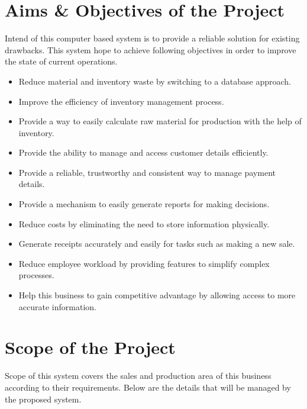 \documentclass[12pt]{report}
\begin{document}
\section{Aims \& Objectives of the Project}

Intend of this computer based system is to provide a reliable solution for existing drawbacks.  This system hope to achieve following objectives in order to improve the state of current operations.

\begin{itemize}
	\item Reduce material and inventory waste by switching to a database approach.

	\item Improve the efficiency of inventory management process.

	\item Provide a way to easily calculate raw material for production with the help of inventory.

	\item Provide the ability to manage and access customer details efficiently.

	\item Provide a reliable,  trustworthy and consistent way to manage payment details.

	\item Provide a mechanism to easily generate reports for making decisions.

	\item Reduce costs by eliminating the need to store information physically.

	\item Generate receipts accurately and easily for tasks such as making a new sale.

	\item Reduce employee workload by providing features to simplify complex processes.

	\item Help this business to gain competitive advantage by allowing access to more accurate information.
\end{itemize}

\section{Scope of the Project}
Scope of this system covers the sales and production area of this business according to their requirements. Below are the details that will be managed by the proposed system.
\end{document}

